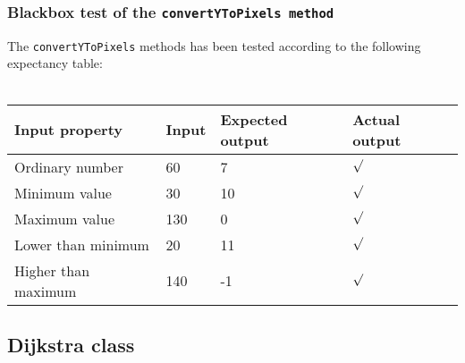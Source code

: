 \documentclass[a4paper,11pt]{article}
\begin{document}
\subsubsection{Blackbox test of the \texttt{convertYToPixels method}}
The \texttt{convertYToPixels} methods has been tested according to the following expectancy table: \\ \\
\begin{tabular}{ p{3.5cm} | p{2.5cm} | p{2.5cm} | p{2.5cm} }
	Input property & Input & Expected output & Actual output \\
	\hline
	Ordinary number & 60 & 7 & $\surd$ \\
	Minimum value & 30 & 10 & $\surd$ \\
	Maximum value & 130 & 0 & $\surd$ \\
	Lower than minimum & 20 & 11 & $\surd$ \\
	Higher than maximum & 140 & -1 & $\surd$
\end{tabular}

\pagebreak
\subsection{Dijkstra class}
\label{sec:Dijkstra class}


\pagebreak
\end{document}
